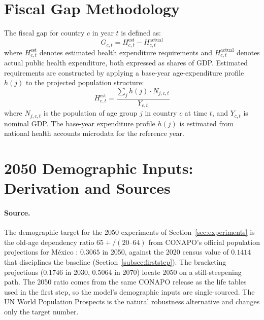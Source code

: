 \documentclass[12pt,a4paper]{article}
\begin{document}
\begin{appendices}
\section{Fiscal Gap Methodology}
\label{app:fiscal_gap}

The fiscal gap for country $c$ in year $t$ is defined as:
\begin{equation}
\label{eq:fiscal_gap}
G_{c,t} = H_{c,t}^{\text{est}} - H_{c,t}^{\text{actual}}
\end{equation}
where $H_{c,t}^{\text{est}}$ denotes estimated health expenditure requirements and $H_{c,t}^{\text{actual}}$ denotes actual public health expenditure, both expressed as shares of GDP. Estimated requirements are constructed by applying a base-year age-expenditure profile $h(j)$ to the projected population structure:
\begin{equation}
\label{eq:fiscal_gap_est}
H_{c,t}^{\text{est}} = \frac{\sum_j h(j) \cdot N_{j,c,t}}{Y_{c,t}}
\end{equation}
where $N_{j,c,t}$ is the population of age group $j$ in country $c$ at time $t$, and $Y_{c,t}$ is nominal GDP. The base-year expenditure profile $h(j)$ is estimated from national health accounts microdata for the reference year.


\section{2050 Demographic Inputs: Derivation and Sources}
\label{app:demog2050}

\paragraph{Source.} The demographic target for the 2050 experiments of Section~\ref{sec:experiments} is the old-age dependency ratio $65{+}/(20\text{--}64)$ from CONAPO's official population projections for M\'exico \citep[Proyecciones de la Poblaci\'on de M\'exico y de las Entidades Federativas, 2023 revision;][]{CONAPO2023}: $0.3065$ in 2050, against the 2020 census value of $0.1414$ that disciplines the baseline (Section~\ref{subsec:firststep}). The bracketing projections ($0.1746$ in 2030, $0.5064$ in 2070) locate 2050 on a still-steepening path. The 2050 ratio comes from the same CONAPO release as the life tables used in the first step, so the model's demographic inputs are single-sourced. The UN World Population Prospects is the natural robustness alternative and changes only the target number.


\end{appendices}
\end{document}
